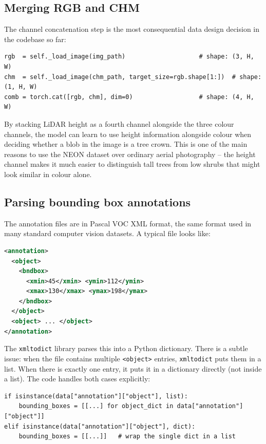 \documentclass[11pt, a4paper]{article}
\begin{document}
\subsection{Merging RGB and CHM}

The channel concatenation step is the most consequential data design decision
in the codebase so far:

\begin{lstlisting}
rgb  = self._load_image(img_path)                    # shape: (3, H, W)
chm  = self._load_image(chm_path, target_size=rgb.shape[1:])  # shape: (1, H, W)
comb = torch.cat([rgb, chm], dim=0)                  # shape: (4, H, W)
\end{lstlisting}

By stacking LiDAR height as a fourth channel alongside the three colour
channels, the model can learn to use height information alongside colour when
deciding whether a blob in the image is a tree crown. This is one of the main
reasons to use the NEON dataset over ordinary aerial photography -- the height
channel makes it much easier to distinguish tall trees from low shrubs that
might look similar in colour alone.

\subsection{Parsing bounding box annotations}

The annotation files are in Pascal VOC XML format, the same format used in
many standard computer vision datasets. A typical file looks like:

\begin{lstlisting}[language=XML]
<annotation>
  <object>
    <bndbox>
      <xmin>45</xmin> <ymin>112</ymin>
      <xmax>130</xmax> <ymax>198</ymax>
    </bndbox>
  </object>
  <object> ... </object>
</annotation>
\end{lstlisting}

The \texttt{xmltodict} library parses this into a Python dictionary. There is
a subtle issue: when the file contains multiple \texttt{<object>} entries,
\texttt{xmltodict} puts them in a list. When there is exactly one entry, it
puts it in a dictionary directly (not inside a list). The code handles both
cases explicitly:

\begin{lstlisting}
if isinstance(data["annotation"]["object"], list):
    bounding_boxes = [[...] for object_dict in data["annotation"]["object"]]
elif isinstance(data["annotation"]["object"], dict):
    bounding_boxes = [[...]]   # wrap the single dict in a list
\end{lstlisting}
\end{document}
